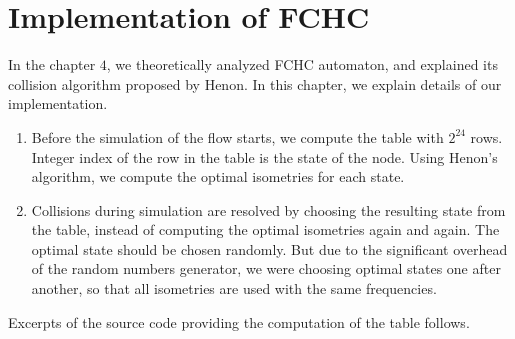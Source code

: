 \chapter{Implementation of FCHC}

In the chapter $4$, we theoretically analyzed FCHC automaton, and explained its collision algorithm proposed by Henon. In this chapter, we explain details of our implementation.

%



\begin{enumerate}
\item Before the simulation of the flow starts, we compute the table with $2^{24}$ rows. Integer index of the row in the table is the state of the node. Using Henon's algorithm, we compute the optimal isometries for each state.
\item Collisions during simulation are resolved by choosing the resulting state from the table, instead of computing the optimal isometries again and again. 
The optimal state should be chosen randomly. But due to the significant overhead of the random numbers generator, we were choosing optimal states one after another, so that all isometries are used with the same frequencies.
%

\end{enumerate}

Excerpts of the source code providing the computation of the table follows.

